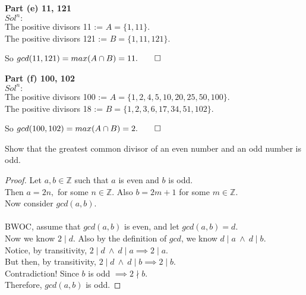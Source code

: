 \documentclass[12pt]{article}
\newcommand{\Z}{\mathbb{Z}}
\newenvironment{exercise}[2][Exercise]{\begin{trivlist}
\item[\hskip \labelsep {\bfseries #1}\hskip \labelsep {\bfseries #2.}]}{\end{trivlist}}
\begin{document}
\noindent \textbf{Part (e) 11, 121}\\
$Sol^n:$\\
The positive divisors 11 := $A=\{1,11\}$.\\
The positive divisors 121 := $B=\{1,11,121\}$.
\begin{center}
So $gcd(11,121)=max(A\cap B)=11.\qed$
\end{center}

\noindent \textbf{Part (f) 100, 102}\\
$Sol^n:$\\
The positive divisors 100 := $A=\{1,2,4,5,10,20,25,50,100\}$.\\
The positive divisors 18 := $B=\{1,2,3,6,17,34,51,102\}$.
\begin{center}
So $gcd(100,102)=max(A\cap B)=2.\qed$
\end{center}


\renewcommand\qedsymbol{$q.e.d.$} 
\begin{exercise}{3.3.8} Show that the greatest common divisor of an even number and an odd number is odd.
\end{exercise}
\begin{proof}
Let $a,b\in \Z$ such that $a$ is even and $b$ is odd.\\
Then $a=2n,$ for some $n\in \Z$. Also $b=2m+1$ for some $m\in \Z$.\\
Now consider $gcd(a,b)$.\\\\
BWOC, assume that $gcd(a,b)$ is even, and let $gcd(a,b)=d$.\\
Now we know $2\mid d$. Also by the definition of $gcd$, we know $d \mid a ~\land~ d\mid b$.\\
Notice, by transitivity, $2\mid d ~\land~ d\mid a \implies 2\mid a$.\\
But then, by transitivity, $2\mid d ~\land~ d\mid b \implies 2\mid b$. \\
Contradiction! Since $b$ is odd $\implies 2\nmid b$.\\

\noindent Therefore, $gcd(a,b)$ is odd.
\end{proof}
\end{document}
